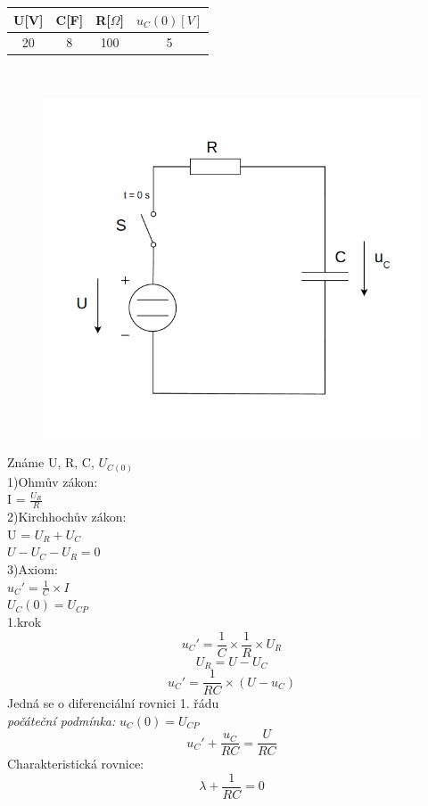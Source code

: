 \documentclass[12pt]{article}
\begin{document}
\begin{center}
\begin{tabular}{| c | c | c | c |}
\hline
U[V] & C[F] & R[$\Omega$] & $u_{C}(0)[V]$ \\
\hline
20 & 8 & 100 & 5\\
\hline
\end{tabular}\\
\end{center}
\begin{figure}[t]
\includegraphics[width=12cm]{priklad5_0}
\centering
\centering
\end{figure}
Známe U, R, C, $U_{C(0)}$\\
1)Ohmův zákon:\\ I = $\frac{U_{R}}{R}$\\
2)Kirchhochův zákon:\\ U = $U_{R}+U_{C}$\\ $U-U_{C}-U_{R}=0$\\
3)Axiom:\\$u_{C}'=\frac{1}{C} \times I$\\ $U_{C}(0)=U_{CP}$\\
1.krok\\
\[
  u_{C}'=\displaystyle\frac{1}{C} \times \displaystyle\frac{1}{R} \times U_{R}
\]
\[
  U_{R} = U-U_{C}
\]
\[
  u_{C}'=\displaystyle\frac{1}{RC} \times (U-u_{C})
\]
Jedná se o diferenciální rovnici 1. řádu\\
\textit{počáteční podmínka:} $u_{C}(0)=U_{CP}$\\
\[
  u_{C}'+\displaystyle\frac{u_{C}}{RC}= \displaystyle\frac{U}{RC}
\]
Charakteristická rovnice:
\[
  \lambda + \displaystyle\frac{1}{RC}=0
\]
\end{document}
